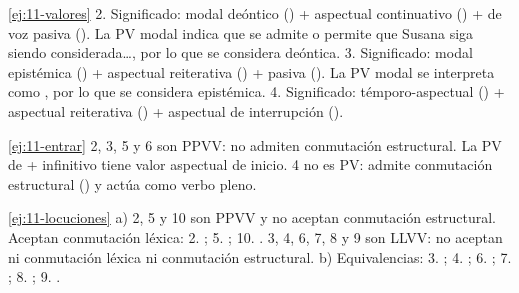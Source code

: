 \begin{solucion}{\ref{ej:11-valores}}
2. Significado: modal deóntico () + aspectual continuativo
() + de voz pasiva (). La PV modal
indica que se admite o permite que Susana siga siendo considerada\ldots, por lo
que se considera deóntica. 3. Significado: modal epistémica () +
aspectual reiterativa () + pasiva (). La PV
modal se interpreta como , por lo
que se considera epistémica. 4. Significado: témporo-aspectual
() + aspectual reiterativa () + aspectual de
interrupción ().
\end{solucion}

\begin{solucion}{\ref{ej:11-entrar}}
2, 3, 5 y 6 son PPVV: no admiten conmutación estructural. La PV de
 + infinitivo tiene valor aspectual de inicio. 4 no es PV: admite
conmutación estructural () y
 actúa como verbo pleno.
\end{solucion}

\begin{solucion}{\ref{ej:11-locuciones}}
a) 2, 5 y 10 son PPVV y no aceptan conmutación estructural. Aceptan conmutación
léxica: 2. ; 5. ; 10. . 3, 4, 6, 7, 8 y 9 son LLVV: no aceptan ni conmutación léxica ni
conmutación estructural. b)
Equivalencias: 3. ; 4. ; 6. ; 7.
; 8. ; 9. .
\end{solucion}
